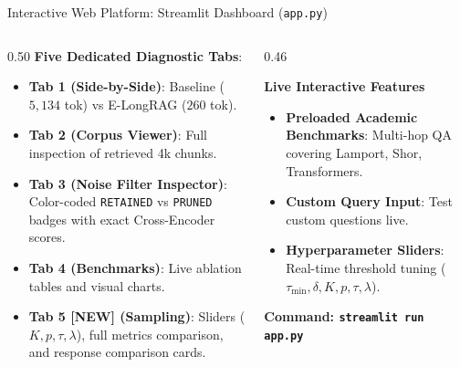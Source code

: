 \documentclass[10pt,aspectratio=169]{beamer}
\begin{document}
\begin{frame}{Interactive Web Platform: Streamlit Dashboard (\texttt{app.py})}
    \begin{columns}[onlytextwidth,T]
        \begin{column}{0.50\textwidth}
            \textbf{Five Dedicated Diagnostic Tabs}:
            \begin{itemize}\setlength\itemsep{2pt}
                \item \textbf{Tab 1 (Side-by-Side)}: Baseline ($5,134$ tok) vs E-LongRAG ($260$ tok).
                \item \textbf{Tab 2 (Corpus Viewer)}: Full inspection of retrieved 4k chunks.
                \item \textbf{Tab 3 (Noise Filter Inspector)}: Color-coded \texttt{RETAINED} vs \texttt{PRUNED} badges with exact Cross-Encoder scores.
                \item \textbf{Tab 4 (Benchmarks)}: Live ablation tables and visual charts.
                \item \textbf{Tab 5 [NEW] (Sampling)}: Sliders ($K, p, \tau, \lambda$), full metrics comparison, and response comparison cards.
            \end{itemize}
        \end{column}
        
        \begin{column}{0.46\textwidth}
            \begin{block}{\textbf{Live Interactive Features}}
                \footnotesize
                \begin{itemize}\setlength\itemsep{2pt}
                    \item \textbf{Preloaded Academic Benchmarks}: Multi-hop QA covering Lamport, Shor, Transformers.
                    \item \textbf{Custom Query Input}: Test custom questions live.
                    \item \textbf{Hyperparameter Sliders}: Real-time threshold tuning ($\tau_{\min}, \delta, K, p, \tau, \lambda$).
                \end{itemize}
            \end{block}
            \vspace{0.15cm}
            \begin{center}
                \textcolor{accentgreen}{\textbf{Command: \texttt{streamlit run app.py}}}
            \end{center}
        \end{column}
    \end{columns}
\end{frame}
\end{document}
